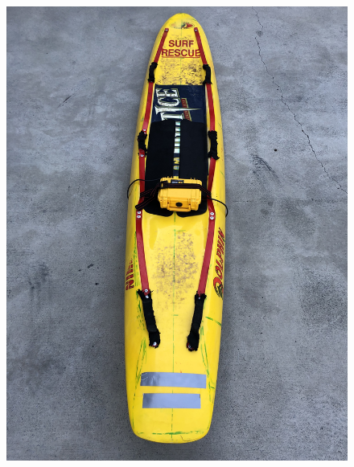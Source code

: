 \documentclass[a4paper]{IEEEtran}
\begin{document}
\begin{figure}[h!]
\begin{minipage}{0.5\columnwidth}
\includegraphics[width=\textwidth]{boat-top.jpg}
\end{minipage}%
\begin{minipage}{0.5\columnwidth}

\end{minipage}
\end{figure}
\end{document}
